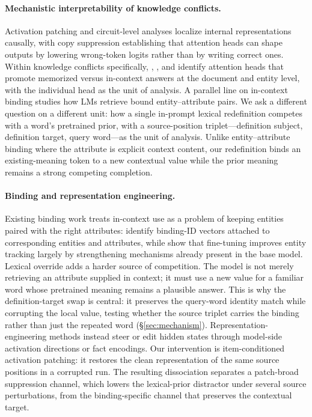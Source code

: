 \documentclass[11pt]{article}
\begin{document}
\paragraph{Mechanistic interpretability of knowledge conflicts.}
Activation patching \citep{vig2020causal, meng2022rome, zhang2024towards} and circuit-level
analyses \citep{wang2023ioi, olsson2022induction, mcdougall2024copy} localize internal
representations causally, with copy suppression \citep{mcdougall2024copy} establishing that
attention heads can shape outputs by lowering wrong-token logits rather than by writing
correct ones. Within knowledge conflicts specifically, \citet{yu2023characterizing},
\citet{ortu2024competition}, and \citet{jin2024cutting} identify attention heads that promote
memorized versus in-context answers at the document and entity level, with the individual
head as the unit of analysis. A parallel line on in-context binding
\citep{feng2024binding, prakash2024finetuning} studies how LMs retrieve bound
entity--attribute pairs. We ask a different question on a different unit: how a single
in-prompt lexical redefinition competes with a word's pretrained prior, with a
source-position triplet---definition subject, definition target, query word---as the unit of
analysis. Unlike entity--attribute binding where the attribute is explicit context
content, our redefinition binds an existing-meaning token to a new contextual value while the
prior meaning remains a strong competing completion.

\paragraph{Binding and representation engineering.}
Existing binding work treats in-context use as a problem of keeping entities paired with the
right attributes: \citet{feng2024binding} identify binding-ID vectors attached to
corresponding entities and attributes, while \citet{prakash2024finetuning} show that
fine-tuning improves entity tracking largely by strengthening mechanisms already present in
the base model. Lexical override adds a harder source of competition. The model is not merely
retrieving an attribute supplied in context; it must use a new value for a familiar word whose
pretrained meaning remains a plausible answer. This is why the definition-target swap is
central: it preserves the query-word identity match while corrupting the local value, testing
whether the source triplet carries the binding rather than just the repeated word
(\S\ref{sec:mechanism}). Representation-engineering methods
\citep{turner2023activation, zou2023representation, hernandez2024inspecting} instead steer
or edit hidden states through model-side activation directions or fact encodings. Our
intervention is item-conditioned activation patching: it restores the clean representation of
the same source positions in a corrupted run. The resulting dissociation separates a
patch-broad suppression channel, which lowers the lexical-prior distractor under several
source perturbations, from the binding-specific channel that preserves the contextual target.
\end{document}
